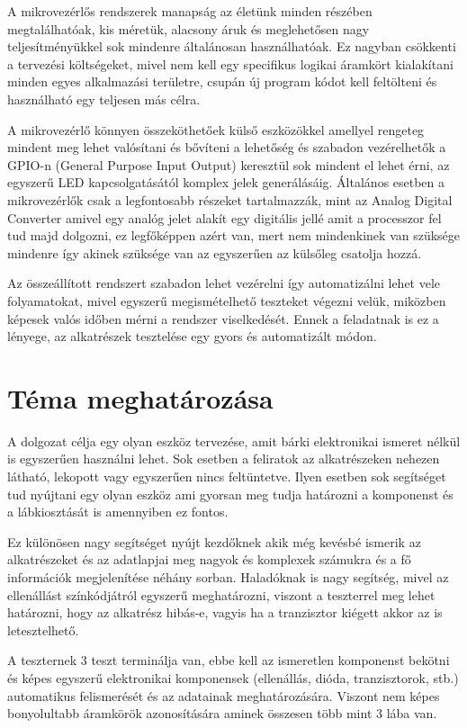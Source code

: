 A mikrovezérlős rendszerek manapság az életünk minden részében megtalálhatóak, kis méretük, 
alacsony áruk és meglehetősen nagy teljesítményükkel sok mindenre általánosan használhatóak. 
Ez nagyban csökkenti a tervezési költségeket, mivel nem kell egy specifikus logikai áramkört 
kialakítani minden egyes alkalmazási területre, csupán új program kódot kell feltölteni és 
használható egy teljesen más célra.

A mikrovezérlő könnyen összeköthetőek külső eszközökkel amellyel rengeteg mindent meg lehet 
valósítani és bővíteni a lehetőség és szabadon vezérelhetők a GPIO-n (General Purpose Input 
Output) keresztül sok mindent el lehet érni, az egyszerű LED kapcsolgatásától komplex jelek 
generálásáig. Általános esetben a mikrovezérlők csak a legfontosabb részeket tartalmazzák, 
mint az Analog Digital Converter amivel egy analóg jelet alakít egy digitális jellé amit a 
processzor fel tud majd dolgozni, ez legfőképpen azért van, mert nem mindenkinek van szüksége 
mindenre így akinek szüksége van az egyszerűen az külsőleg csatolja hozzá. 

Az összeállított rendszert szabadon lehet vezérelni így automatizálni lehet vele folyamatokat,
mivel egyszerű megismételhető teszteket végezni velük, miközben képesek valós időben mérni 
a rendszer viselkedését. Ennek a feladatnak is ez a lényege, az alkatrészek tesztelése egy 
gyors és automatizált módon. 


\section{Téma meghatározása}

A dolgozat célja egy olyan eszköz tervezése, amit bárki elektronikai ismeret nélkül is egyszerűen 
használni lehet. Sok esetben a feliratok az alkatrészeken nehezen látható, lekopott vagy 
egyszerűen nincs feltüntetve. Ilyen esetben sok segítséget tud nyújtani egy olyan eszköz ami 
gyorsan meg tudja határozni a komponenst és a lábkiosztását is amennyiben ez fontos.

Ez különösen nagy segítséget nyújt kezdőknek akik még kevésbé ismerik az alkatrészeket és az 
adatlapjai meg nagyok és komplexek számukra és a fő információk megjelenítése néhány sorban. 
Haladóknak is nagy segítség, mivel az ellenállást színkódjátról egyszerű meghatározni, viszont 
a teszterrel meg lehet határozni, hogy az alkatrész hibás-e, vagyis ha a tranzisztor kiégett 
akkor az is letesztelhető.

A teszternek 3 teszt terminálja van, ebbe kell az ismeretlen komponenst bekötni és képes 
egyszerű elektronikai komponensek (ellenállás, dióda, tranzisztorok, stb.) automatikus 
felismerését és az adatainak meghatározására. Viszont nem képes bonyolultabb áramkörök 
azonosítására aminek összesen több mint 3 lába van.

